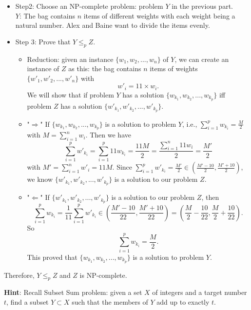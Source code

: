 \documentclass{article}
\begin{document}
\begin{itemize}
\begin{tcolorbox}
\begin{itemize}
\item Step2: Choose an NP-complete problem:  problem $Y$ in the previous part. \\
 $Y$: The bag contains $n$ items of different weights with each weight being a natural number. Alex and Baine want to divide the items evenly.  
\item Step 3: Prove that $Y \leq_p  Z$.
\begin{itemize}
\item Reduction: given an instance $\{w_1, w_2, ..., w_n\}$ of $Y$, we can create an instance of $Z$ as this: the bag contains $n$ items of weights $\{w'_1, w'_2, ..., w'_n\}$ with $$w'_{i} = 11 \times w_i.$$ We will show that if problem $Y$ has a solution $\{w_{k_1}, w_{k_2}, ..., w_{k_p}\}$ iff problem $Z$ has a solution $\{w'_{k_1}, w'_{k_2}, ..., w'_{k_p}\}$.

\item "$\Rightarrow$" If $\{w_{k_1}, w_{k_2}, ..., w_{k_p} \}$ is a solution to problem $Y$, i.e., $\sum_{i=1}^p w_{k_i} = \frac {M }{2}$ with $M = \sum_{i=1}^n w_i $. Then we have $$\sum_{i=1}^p w'_{k_i} = \sum_{i=1}^p 11w_{k_i}= \frac{11M}{2} = \frac{\sum_{i=1}^n 11w_i}{2} = \frac{M'}{2}$$ with $M' = \sum_{i=1}^n w'_i = 11M$. Since $\sum_{i=1}^p w'_{k_i} = \frac{M'}{2} \in ( \frac {M' - 10 }{2}, \frac {M'+ 10 }{2} )$, we know $\{w'_{k_1}, w'_{k_2}, ..., w'_{k_p}\}$ is a solution to our problem $Z$. 

\item "$\Leftarrow$" If $\{w'_{k_1}, w'_{k_2}, ..., w'_{k_p}\}$ is a solution to our problem $Z$, then $$\sum_{i=1}^p w_{k_i}=\frac{1}{11}  \sum_{i=1}^p w'_{k_i} \in (  \frac {M' - 10 }{22}, \frac {M'+ 10 }{22} ) = (\frac{M}{2} - \frac{10}{22}, \frac{M}{2} + \frac{10}{22}).$$ So $$\sum_{i=1}^p w_{k_i} =  \frac{M}{2}.$$ This proved that $\{w_{k_1}, w_{k_2}, ..., w_{k_p} \}$ is a solution to problem $Y$. 
\end{itemize}
\end{itemize}
Therefore, $Y \leq_p  Z$ and $Z$ is NP-complete.
\end{tcolorbox}
\end{itemize}


\textbf{Hint}: Recall Subset Sum problem: given a set $X$ of integers and a target number $t$, find a subset $Y\subset X$ such that the members of $Y$ add up to exactly $t$. 
\end{document}
